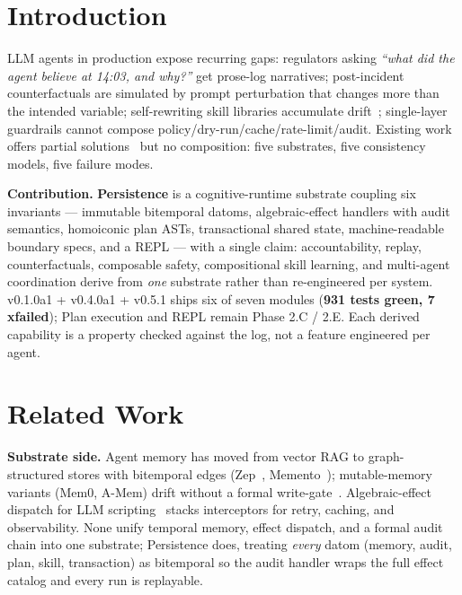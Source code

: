 \documentclass[anon]{nesy2026}   %
\begin{document}
\section{Introduction}\label{sec:intro}

LLM agents in production expose recurring gaps: regulators asking \emph{``what did the agent believe at 14:03, and why?''} get prose-log narratives; post-incident counterfactuals are simulated by prompt perturbation that changes more than the intended variable; self-rewriting skill libraries accumulate drift~\citep{hannecke2026ssgm}; single-layer guardrails cannot compose policy/dry-run/cache/rate-limit/audit. Existing work offers partial solutions~\citep{kurtic2025zep,cheng2025pangolin,khattab2023dspy,wang2023voyager,anon2026camo} but no composition: five substrates, five consistency models, five failure modes.

\textbf{Contribution.} \textbf{Persistence} is a cognitive-runtime substrate coupling six invariants --- immutable bitemporal datoms, algebraic-effect handlers with audit semantics, homoiconic plan ASTs, transactional shared state, machine-readable boundary specs, and a REPL --- with a single claim: accountability, replay, counterfactuals, composable safety, compositional skill learning, and multi-agent coordination derive from \emph{one} substrate rather than re-engineered per system. v0.1.0a1 + v0.4.0a1 + v0.5.1 ships six of seven modules (\textbf{931 tests green, 7 xfailed}); Plan execution and REPL remain Phase 2.C / 2.E. Each derived capability is a property checked against the log, not a feature engineered per agent.

\section{Related Work}\label{sec:related}

\textbf{Substrate side.} Agent memory has moved from vector RAG to graph-structured stores with bitemporal edges (Zep~\citep{kurtic2025zep}, Memento~\citep{n1n2026memento}); mutable-memory variants (Mem0, A-Mem) drift without a formal write-gate~\citep{hannecke2026ssgm}. Algebraic-effect dispatch for LLM scripting~\citep{wang2025composable,cheng2025pangolin} stacks interceptors for retry, caching, and observability. None unify temporal memory, effect dispatch, and a formal audit chain into one substrate; Persistence does, treating \emph{every} datom (memory, audit, plan, skill, transaction) as bitemporal so the audit handler wraps the full effect catalog and every run is replayable.
\end{document}
